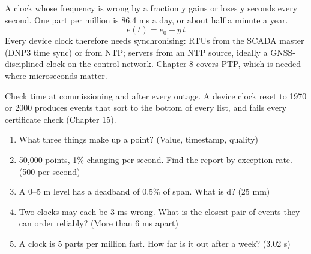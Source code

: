  A clock whose frequency is wrong by a fraction y gains or loses y seconds every second. One part per million is 86.4 ms a day, or about half a minute a year.
\[ e(t) = e_0 + y\,t \]
Every device clock therefore needs synchronising: RTUs from the SCADA master (DNP3 time sync) or from NTP; servers from an NTP source, ideally a GNSS-disciplined clock on the control network. Chapter 8 covers PTP, which is needed where microseconds matter.

\onsite Check time at commissioning and after every outage. A device clock reset to 1970 or 2000 produces events that sort to the bottom of every list, and fails every certificate check (Chapter 15).

\begin{enumerate}
\item What three things make up a point? (Value, timestamp, quality)
\item 50,000 points, 1\% changing per second. Find the report-by-exception rate. (500 per second)
\item A 0–5 m level has a deadband of 0.5\% of span. What is d? (25 mm)
\item Two clocks may each be 3 ms wrong. What is the closest pair of events they can order reliably? (More than 6 ms apart)
\item A clock is 5 parts per million fast. How far is it out after a week? (3.02 s)
\end{enumerate}
